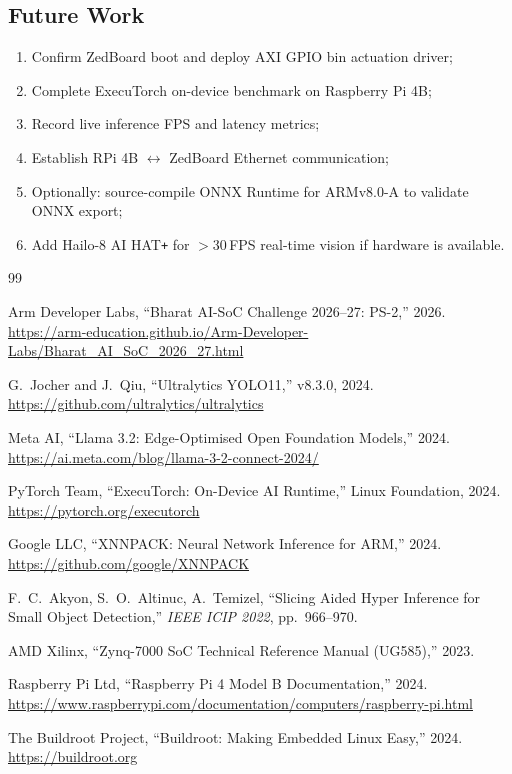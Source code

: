 \documentclass[12pt,a4paper]{article}
\begin{document}
\subsection{Future Work}

\begin{enumerate}[label=\textbf{W\arabic*.}]
  \item Confirm ZedBoard boot and deploy AXI GPIO bin actuation driver;
  \item Complete ExecuTorch on-device benchmark on Raspberry Pi 4B;
  \item Record live inference FPS and latency metrics;
  \item Establish RPi 4B $\leftrightarrow$ ZedBoard Ethernet communication;
  \item Optionally: source-compile ONNX Runtime for ARMv8.0-A to validate ONNX export;
  \item Add Hailo-8 AI HAT\texttt{+} for $>$30\,FPS real-time vision if hardware is available.
\end{enumerate}

\clearpage

\begin{thebibliography}{99}

Arm Developer Labs,
``Bharat AI-SoC Challenge 2026--27: PS-2,'' 2026.
\url{https://arm-education.github.io/Arm-Developer-Labs/Bharat_AI_SoC_2026_27.html}

G.~Jocher and J.~Qiu, ``Ultralytics YOLO11,'' v8.3.0, 2024.
\url{https://github.com/ultralytics/ultralytics}

Meta AI, ``Llama 3.2: Edge-Optimised Open Foundation Models,'' 2024.
\url{https://ai.meta.com/blog/llama-3-2-connect-2024/}

PyTorch Team, ``ExecuTorch: On-Device AI Runtime,'' Linux Foundation, 2024.
\url{https://pytorch.org/executorch}

Google LLC, ``XNNPACK: Neural Network Inference for ARM,'' 2024.
\url{https://github.com/google/XNNPACK}

F.~C.~Akyon, S.~O.~Altinuc, A.~Temizel,
``Slicing Aided Hyper Inference for Small Object Detection,''
\emph{IEEE ICIP 2022}, pp.~966--970.

AMD Xilinx, ``Zynq-7000 SoC Technical Reference Manual (UG585),'' 2023.

Raspberry Pi Ltd, ``Raspberry Pi 4 Model B Documentation,'' 2024.
\url{https://www.raspberrypi.com/documentation/computers/raspberry-pi.html}

The Buildroot Project, ``Buildroot: Making Embedded Linux Easy,'' 2024.
\url{https://buildroot.org}

\end{thebibliography}
\end{document}

